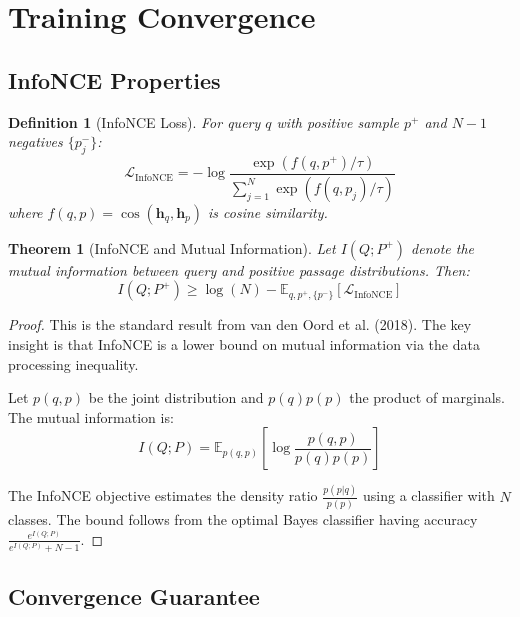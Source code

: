 \documentclass[11pt]{article}
\newtheorem{theorem}{Theorem}
\newtheorem{definition}{Definition}
\begin{document}
\section{Training Convergence}
\label{sec:training}

\subsection{InfoNCE Properties}

\begin{definition}[InfoNCE Loss]
For query $q$ with positive sample $p^+$ and $N-1$ negatives $\{p^-_j\}$:
\begin{equation}
\mathcal{L}_{\text{InfoNCE}} = -\log \frac{\exp(f(q, p^+)/\tau)}{\sum_{j=1}^N \exp(f(q, p_j)/\tau)}
\end{equation}
where $f(q, p) = \cos(\mathbf{h}_q, \mathbf{h}_p)$ is cosine similarity.
\end{definition}

\begin{theorem}[InfoNCE and Mutual Information]
\label{thm:infonce_full}
Let $I(Q; P^+)$ denote the mutual information between query and positive passage distributions. Then:
\begin{equation}
I(Q; P^+) \geq \log(N) - \mathbb{E}_{q, p^+, \{p^-\}}[\mathcal{L}_{\text{InfoNCE}}]
\end{equation}
\end{theorem}

\begin{proof}
This is the standard result from van den Oord et al. (2018). The key insight is that InfoNCE is a lower bound on mutual information via the data processing inequality.

Let $p(q, p)$ be the joint distribution and $p(q)p(p)$ the product of marginals. The mutual information is:
\begin{equation}
I(Q; P) = \mathbb{E}_{p(q,p)}\left[\log \frac{p(q, p)}{p(q)p(p)}\right]
\end{equation}

The InfoNCE objective estimates the density ratio $\frac{p(p|q)}{p(p)}$ using a classifier with $N$ classes. The bound follows from the optimal Bayes classifier having accuracy $\frac{e^{I(Q;P)}}{e^{I(Q;P)} + N - 1}$.
\end{proof}

\subsection{Convergence Guarantee}
\end{document}
